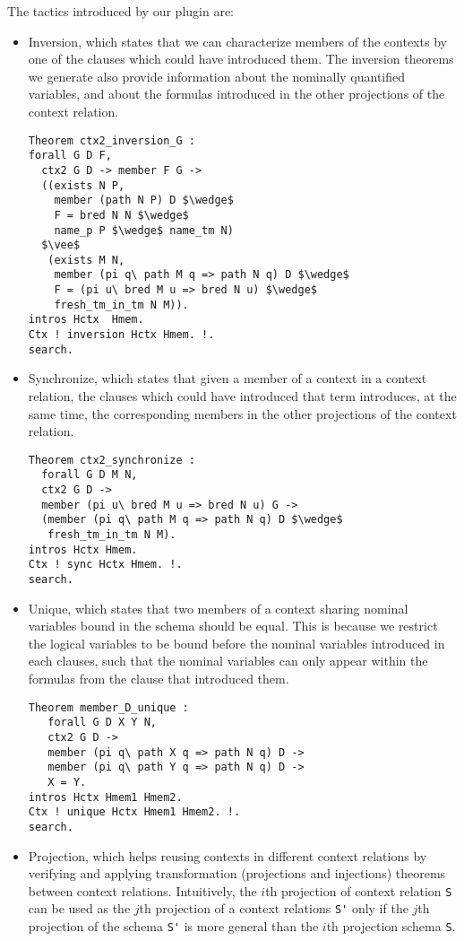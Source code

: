 \documentclass[nocopyrightspace,authoryear]{sigplanconf}
\begin{document}
The tactics introduced by our plugin are:
\begin{itemize}
\item Inversion, which states that we can characterize members of the contexts by one of the clauses which could have introduced them. The inversion theorems we generate also provide information about the nominally quantified variables, and about the formulas introduced in the other projections of the context relation.

\begin{lstlisting}
Theorem ctx2_inversion_G :
forall G D F,
  ctx2 G D -> member F G ->
  ((exists N P, 
    member (path N P) D $\wedge$
    F = bred N N $\wedge$  
    name_p P $\wedge$ name_tm N)
  $\vee$
   (exists M N, 
    member (pi q\ path M q => path N q) D $\wedge$ 
    F = (pi u\ bred M u => bred N u) $\wedge$  
    fresh_tm_in_tm N M)).
intros Hctx  Hmem. 
Ctx ! inversion Hctx Hmem. !.
search.
\end{lstlisting}

\item Synchronize, which states that given a member of a context in a context relation, the clauses which could have introduced that term introduces, at the same time, the corresponding members in the other projections of the context relation.
\begin{lstlisting}
Theorem ctx2_synchronize :
  forall G D M N,
  ctx2 G D ->
  member (pi u\ bred M u => bred N u) G ->
  (member (pi q\ path M q => path N q) D $\wedge$ 
   fresh_tm_in_tm N M).
intros Hctx Hmem. 
Ctx ! sync Hctx Hmem. !.
search.
\end{lstlisting}

\item Unique, which states that two members of a context sharing nominal variables bound in the schema should be equal. This is because we restrict the logical variables to be bound before the nominal variables introduced in each clauses, such that the nominal variables can only appear within the formulas from the clause that introduced them. 

\begin{lstlisting}
Theorem member_D_unique :
   forall G D X Y N,
   ctx2 G D ->
   member (pi q\ path X q => path N q) D ->
   member (pi q\ path Y q => path N q) D ->
   X = Y.
intros Hctx Hmem1 Hmem2. 
Ctx ! unique Hctx Hmem1 Hmem2. !. 
search.
\end{lstlisting}

\item Projection, which helps reusing contexts in different context relations by verifying and applying transformation (projections and injections) theorems between context relations. Intuitively, the $i$th projection of context relation \lstinline|S| can be used as the $j$th projection of a context relations \lstinline|S'| only if the $j$th projection of the schema \lstinline|S'| is more general than the $i$th projection schema \lstinline|S|.


\end{itemize}
\end{document}
